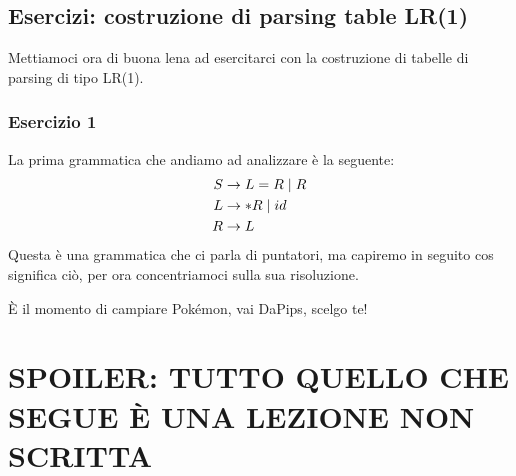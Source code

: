 \documentclass[class=book, crop=false, oneside, 12pt]{standalone}
\begin{document}
\subsection{Esercizi: costruzione di parsing table LR(1)}
Mettiamoci ora di buona lena ad esercitarci con la costruzione di tabelle di parsing di tipo LR(1).

\subsubsection{Esercizio 1}
La prima grammatica che andiamo ad analizzare è la seguente:
\begin{align}
    \label{gr:pointers-grammar}
    S &\to L = R \mid R \\
    L &\to *R \mid id \nonumber \\ \notag
    R &\to L \notag
\end{align}
Questa è una grammatica che ci parla di puntatori, ma capiremo in seguito cos significa ciò, per ora concentriamoci sulla sua risoluzione.

È il momento di campiare Pokémon, vai DaPips, scelgo te!

\section{SPOILER: TUTTO QUELLO CHE SEGUE È UNA LEZIONE NON SCRITTA}
\end{document}
